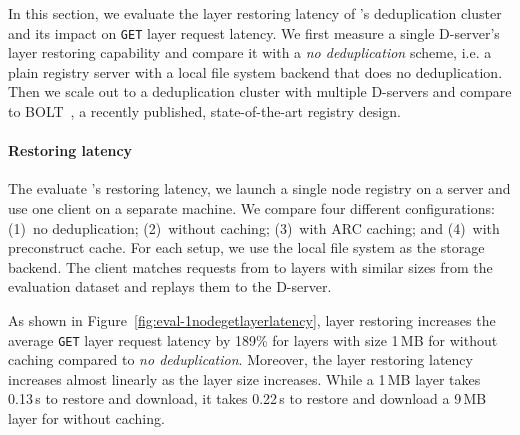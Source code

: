In this section, we evaluate the layer restoring latency of \sysname's deduplication cluster 
and its impact on \texttt{GET} layer request latency.
%
We first measure a single D-server's layer restoring capability and compare it with 
a \emph{no deduplication} scheme, i.e.  a plain registry server with a local file system backend
that does no deduplication.
%
Then we scale out to a deduplication cluster with multiple D-servers and compare
\sysname to BOLT~\cite{littley2019bolt}, a recently published, state-of-the-art registry design.
%
%
%

\paragraph{Restoring latency}
%
%
The evaluate \sysname{}'s restoring latency, we launch a single node registry on a server
and use one client on a separate machine.
%
We compare four different configurations:
(1)~no deduplication;
(2)~\sysname without caching;
(3)~\sysname with ARC caching; and
(4)~\sysname with preconstruct cache.
%
For each setup, we use the local file system as the storage backend.
%
%
The client matches requests from \dal to layers with similar sizes 
from the evaluation dataset and replays them to the D-server.

%
As shown in Figure~\ref{fig:eval-1nodegetlayerlatency}, 
layer restoring increases the average \texttt{GET} layer request latency by 189\% for layers 
with size 1\,MB for \sysname without caching compared to \emph{no deduplication}.
%
Moreover, the layer restoring latency increases almost linearly as the layer size increases.
%
While a 1\,MB layer takes 0.13\,s to restore and download, 
it takes 0.22\,s to restore and download a 9\,MB
layer for \sysname without caching.

